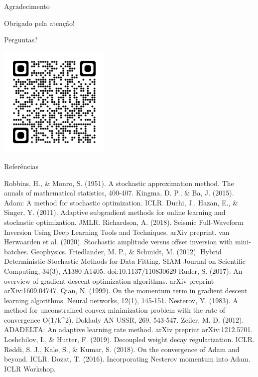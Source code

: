 \documentclass[aspectratio=1610]{beamer}
\begin{document}
\begin{frame}{Agradecimento}
\begin{center}
\Large{Obrigado pela atenção!}

\vspace{1em}
\normalsize{Perguntas?}


\includegraphics[width=0.4\textwidth]{figures/qrcode_github.com}
\end{center}
\end{frame}

\begin{frame}[allowframebreaks]{Referências}
\small
\begin{thebibliography}{99}
     Robbins, H., \& Monro, S. (1951). A stochastic approximation method. The annals of mathematical statistics, 400-407.
     Kingma, D. P., \& Ba, J. (2015). Adam: A method for stochastic optimization. ICLR.
     Duchi, J., Hazan, E., \& Singer, Y. (2011). Adaptive subgradient methods for online learning and stochastic optimization. JMLR.
     Richardson, A. (2018). Seismic Full-Waveform Inversion Using Deep Learning Tools and Techniques. arXiv preprint.
     van Herwaarden et al. (2020). Stochastic amplitude versus offset inversion with mini-batches. Geophysics.
     Friedlander, M. P., \& Schmidt, M. (2012). Hybrid Deterministic-Stochastic Methods for Data Fitting. SIAM Journal on Scientific Computing, 34(3), A1380-A1405. doi:10.1137/110830629
     Ruder, S. (2017). An overview of gradient descent optimization algorithms. arXiv preprint arXiv:1609.04747.
     Qian, N. (1999). On the momentum term in gradient descent learning algorithms. Neural networks, 12(1), 145-151.
     Nesterov, Y. (1983). A method for unconstrained convex minimization problem with the rate of convergence O(1/k\textasciicircum{}2). Doklady AN USSR, 269, 543-547.
     Zeiler, M. D. (2012). ADADELTA: An adaptive learning rate method. arXiv preprint arXiv:1212.5701.
     Loshchilov, I., \& Hutter, F. (2019). Decoupled weight decay regularization. ICLR.
     Reddi, S. J., Kale, S., \& Kumar, S. (2018). On the convergence of Adam and beyond. ICLR.
     Dozat, T. (2016). Incorporating Nesterov momentum into Adam. ICLR Workshop.
\end{thebibliography}
\end{frame}
\end{document}
